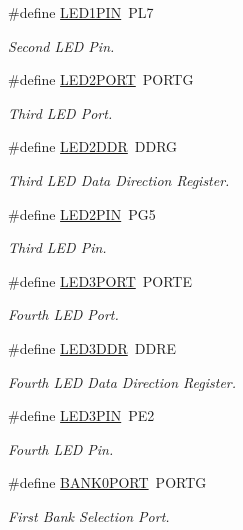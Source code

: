 \begin{DoxyCompactItemize}
\#define \hyperlink{group__config_ga04d7aaffbb7b5afaf49acf8a3a39e33a}{L\-E\-D1\-P\-I\-N}~P\-L7
\begin{DoxyCompactList}\small\item\em Second L\-E\-D Pin. \end{DoxyCompactList}\item 
\#define \hyperlink{group__config_ga4b6e8cddebfbc6f1f5132eb93b92d60f}{L\-E\-D2\-P\-O\-R\-T}~P\-O\-R\-T\-G
\begin{DoxyCompactList}\small\item\em Third L\-E\-D Port. \end{DoxyCompactList}\item 
\#define \hyperlink{group__config_ga7e635626ee31b094da0a668476132577}{L\-E\-D2\-D\-D\-R}~D\-D\-R\-G
\begin{DoxyCompactList}\small\item\em Third L\-E\-D Data Direction Register. \end{DoxyCompactList}\item 
\#define \hyperlink{group__config_ga50070e632cb68d11f627c5ab60f88683}{L\-E\-D2\-P\-I\-N}~P\-G5
\begin{DoxyCompactList}\small\item\em Third L\-E\-D Pin. \end{DoxyCompactList}\item 
\#define \hyperlink{group__config_ga63df95c1a0ce0e770964ca35e4032fb6}{L\-E\-D3\-P\-O\-R\-T}~P\-O\-R\-T\-E
\begin{DoxyCompactList}\small\item\em Fourth L\-E\-D Port. \end{DoxyCompactList}\item 
\#define \hyperlink{group__config_ga09535652dd0ca340b20840c848cb6093}{L\-E\-D3\-D\-D\-R}~D\-D\-R\-E
\begin{DoxyCompactList}\small\item\em Fourth L\-E\-D Data Direction Register. \end{DoxyCompactList}\item 
\#define \hyperlink{group__config_ga2663b8fc01c4753562adc572cf12a5ed}{L\-E\-D3\-P\-I\-N}~P\-E2
\begin{DoxyCompactList}\small\item\em Fourth L\-E\-D Pin. \end{DoxyCompactList}\item 
\#define \hyperlink{group__config_gabeec1986c81588dde8863b7936028fc9}{B\-A\-N\-K0\-P\-O\-R\-T}~P\-O\-R\-T\-G
\begin{DoxyCompactList}\small\item\em First Bank Selection Port. \end{DoxyCompactList}\item 

\end{DoxyCompactItemize}
